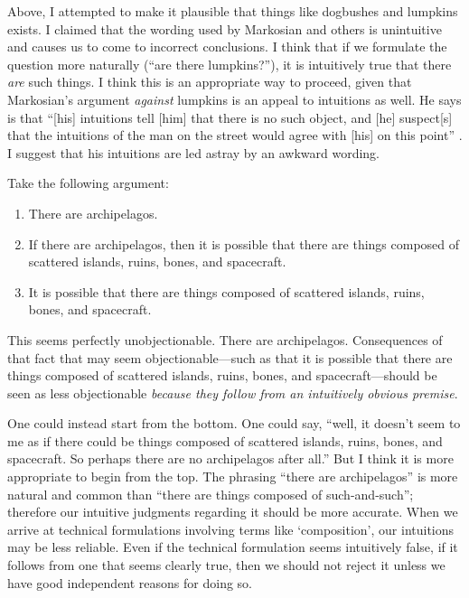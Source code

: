 \documentclass[11pt]{article}
\begin{document}
\begin{spacing}{1.25}
Above, I attempted to make it plausible that things like dogbushes and
lumpkins exists.  I claimed that the wording used by Markosian and
others is unintuitive and causes us to come to incorrect conclusions.
I think that if we formulate the question more naturally (``are there
lumpkins?''), it is intuitively true that there {\em are} such things.
I think this is an appropriate way to proceed, given that Markosian's
argument {\em against} lumpkins is an appeal to intuitions as well.
He says is that ``[his] intuitions tell [him] that there is no such
object, and [he] suspect[s] that the intuitions of the man on the
street would agree with [his] on this point''
\citeyearpar[228]{markosian1998a}.  I suggest that his intuitions are
led astray by an awkward wording.

Take the following argument:

\begin{enumerate}
  \item There are archipelagos.
  \item If there are archipelagos, then it is possible that there are
    things composed of scattered islands, ruins, bones, and
    spacecraft.
  \item It is possible that there are things composed of scattered
    islands, ruins, bones, and spacecraft.
\end{enumerate}

This seems perfectly unobjectionable.  There are archipelagos.
Consequences of that fact that may seem objectionable---such as that
it is possible that there are things composed of scattered islands,
ruins, bones, and spacecraft---should be seen as less objectionable
{\em because they follow from an intuitively obvious premise}.

One could instead start from the bottom.  One could say, ``well, it
doesn't seem to me as if there could be things composed of scattered
islands, ruins, bones, and spacecraft.  So perhaps there are no
archipelagos after all.''  But I think it is more appropriate to begin
from the top.  The phrasing ``there are archipelagos'' is more natural
and common than ``there are things composed of such-and-such'';
therefore our intuitive judgments regarding it should be more
accurate.  When we arrive at technical formulations involving terms
like `composition', our intuitions may be less reliable.  Even if the
technical formulation seems intuitively false, if it follows from one
that seems clearly true, then we should not reject it unless we have
good independent reasons for doing so.


\end{spacing}
\end{document}
